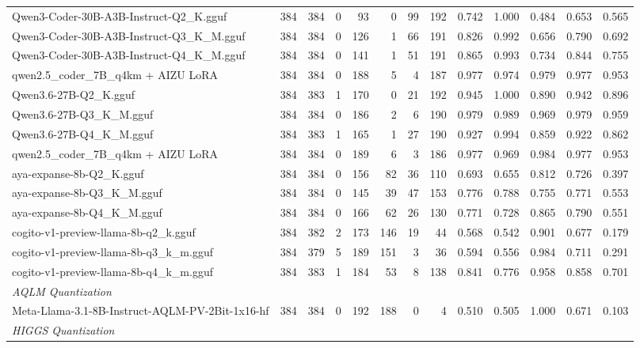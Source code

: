 \begin{table}[htbp]
{\begin{tabular}{lrrrrrrrrrrrr}
    Qwen3-Coder-30B-A3B-Instruct-Q2\_K.gguf & 384 & 384 & 0 & 93 & 0 & 99 & 192 & 0.742 & 1.000 & 0.484 & 0.653 & 0.565 \\
    Qwen3-Coder-30B-A3B-Instruct-Q3\_K\_M.gguf & 384 & 384 & 0 & 126 & 1 & 66 & 191 & 0.826 & 0.992 & 0.656 & 0.790 & 0.692 \\
    Qwen3-Coder-30B-A3B-Instruct-Q4\_K\_M.gguf & 384 & 384 & 0 & 141 & 1 & 51 & 191 & 0.865 & 0.993 & 0.734 & 0.844 & 0.755 \\
    qwen2.5\_coder\_7B\_q4km + AIZU LoRA & 384 & 384 & 0 & 188 & 5 & 4 & 187 & 0.977 & 0.974 & 0.979 & 0.977 & \cellcolor{green!30}0.953 \\
    Qwen3.6-27B-Q2\_K.gguf & 384 & 383 & 1 & 170 & 0 & 21 & 192 & 0.945 & 1.000 & 0.890 & 0.942 & 0.896 \\
    Qwen3.6-27B-Q3\_K\_M.gguf & 384 & 384 & 0 & 186 & 2 & 6 & 190 & 0.979 & 0.989 & 0.969 & 0.979 & \cellcolor{green!50}0.959 \\
    Qwen3.6-27B-Q4\_K\_M.gguf & 384 & 383 & 1 & 165 & 1 & 27 & 190 & 0.927 & 0.994 & 0.859 & 0.922 & 0.862 \\
    qwen2.5\_coder\_7B\_q4km + AIZU LoRA & 384 & 384 & 0 & 189 & 6 & 3 & 186 & 0.977 & 0.969 & 0.984 & 0.977 & \cellcolor{green!40}0.953 \\
    aya-expanse-8b-Q2\_K.gguf & 384 & 384 & 0 & 156 & 82 & 36 & 110 & 0.693 & 0.655 & 0.812 & 0.726 & 0.397 \\
    aya-expanse-8b-Q3\_K\_M.gguf & 384 & 384 & 0 & 145 & 39 & 47 & 153 & 0.776 & 0.788 & 0.755 & 0.771 & 0.553 \\
    aya-expanse-8b-Q4\_K\_M.gguf & 384 & 384 & 0 & 166 & 62 & 26 & 130 & 0.771 & 0.728 & 0.865 & 0.790 & 0.551 \\
    cogito-v1-preview-llama-8b-q2\_k.gguf & 384 & 382 & 2 & 173 & 146 & 19 & 44 & 0.568 & 0.542 & 0.901 & 0.677 & 0.179 \\
    cogito-v1-preview-llama-8b-q3\_k\_m.gguf & 384 & 379 & 5 & 189 & 151 & 3 & 36 & 0.594 & 0.556 & 0.984 & 0.711 & 0.291 \\
    cogito-v1-preview-llama-8b-q4\_k\_m.gguf & 384 & 383 & 1 & 184 & 53 & 8 & 138 & 0.841 & 0.776 & 0.958 & 0.858 & 0.701 \\
    \midrule
    \multicolumn{13}{l}{\textit{AQLM Quantization}} \\
    \midrule
    Meta-Llama-3.1-8B-Instruct-AQLM-PV-2Bit-1x16-hf & 384 & 384 & 0 & 192 & 188 & 0 & 4 & 0.510 & 0.505 & 1.000 & 0.671 & 0.103 \\
    \midrule
    \multicolumn{13}{l}{\textit{HIGGS Quantization}} \\

\end{tabular}}
\end{table}
